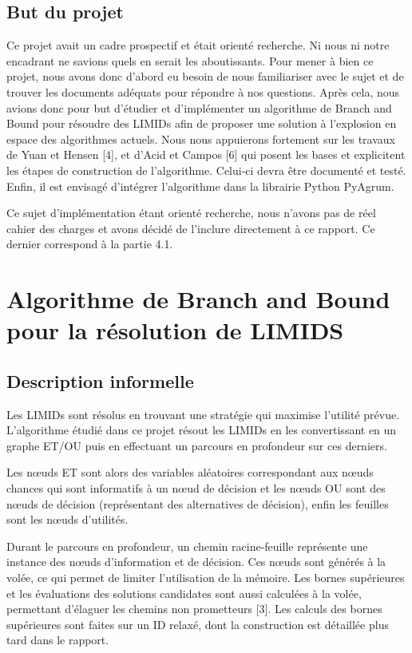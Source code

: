 \documentclass[12pt]{article}
\begin{document}
\subsection{But du projet}
Ce projet avait un cadre prospectif et était orienté recherche. Ni nous ni notre encadrant ne savions quels en serait les aboutissants. Pour mener à bien ce projet, nous avons donc d'abord eu besoin de nous familiariser avec le sujet et de trouver les documents adéquats pour répondre à nos questions. Après cela, nous avions donc pour but d'étudier et d'implémenter un algorithme de Branch and Bound pour résoudre des LIMIDs afin de proposer une solution à l'explosion en espace des algorithmes actuels. Nous nous appuierons fortement sur les travaux de Yuan et Hensen [4], et d'Acid et Campos [6] qui posent les bases et explicitent les étapes de construction de l'algorithme. Celui-ci devra être documenté et testé.
Enfin, il est envisagé d'intégrer l'algorithme dans la librairie Python PyAgrum.

Ce sujet d'implémentation étant orienté recherche, nous n'avons pas de réel cahier des charges et avons décidé de l'inclure directement à ce rapport. Ce dernier correspond à la partie 4.1.    


\section{Algorithme de Branch and Bound pour la résolution de LIMIDS}
\subsection{Description informelle}
Les LIMIDs sont résolus en trouvant une stratégie qui maximise l'utilité prévue.
L'algorithme étudié dans ce projet résout les LIMIDs en les convertissant en un graphe ET/OU puis en effectuant un parcours en profondeur sur ces derniers.

Les nœuds ET sont alors des variables aléatoires correspondant aux nœuds chances qui sont informatifs à un nœud de décision et les nœuds OU sont des nœuds de décision (représentant des alternatives de décision), enfin les feuilles sont les nœuds d'utilités.

Durant le parcours en profondeur, un chemin racine-feuille représente une instance des nœuds d'information et de décision. Ces nœuds sont générés à la volée, ce qui permet de limiter l'utilisation de la mémoire. Les bornes supérieures et les évaluations des solutions candidates sont aussi calculées à la volée, permettant d'élaguer les chemins non prometteurs [3]. Les calculs des bornes supérieures sont faites sur un ID relaxé, dont la construction est détaillée plus tard dans le rapport.
\end{document}
